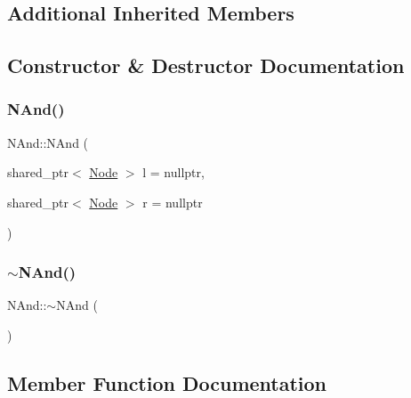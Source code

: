 \subsection*{Additional Inherited Members}


\subsection{Constructor \& Destructor Documentation}
\mbox{\label{class_n_and_a5e73ac719f793d02a10cd0fc6931808f}} 
\subsubsection{\texorpdfstring{N\+And()}{NAnd()}}
{\footnotesize\ttfamily N\+And\+::\+N\+And (\begin{DoxyParamCaption}\item[{shared\+\_\+ptr$<$ \hyperlink{class_node}{Node} $>$}]{l = {\ttfamily nullptr},  }\item[{shared\+\_\+ptr$<$ \hyperlink{class_node}{Node} $>$}]{r = {\ttfamily nullptr} }\end{DoxyParamCaption})\hspace{0.3cm}{\ttfamily [explicit]}}

\mbox{\label{class_n_and_a472d8c586ec989b998d6b182ed581a96}} 
\subsubsection{\texorpdfstring{$\sim$\+N\+And()}{~NAnd()}}
{\footnotesize\ttfamily N\+And\+::$\sim$\+N\+And (\begin{DoxyParamCaption}{ }\end{DoxyParamCaption})\hspace{0.3cm}{\ttfamily [override]}}



\subsection{Member Function Documentation}
\mbox{\label{class_n_and_a2df64f0858e90841201a2acaf50ac587}} 
